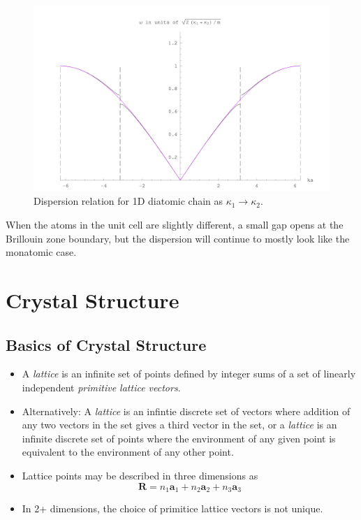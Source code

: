 \documentclass[10pt]{article}
\begin{document}
\begin{figure}
  \includegraphics[width=\linewidth]{1d_dia_to_mono.png}
  \caption{Dispersion relation for 1D diatomic chain as $\kappa_{1} \rightarrow \kappa_{2}$.}
\end{figure}

When the atoms in the unit cell are slightly different, a small gap opens at the Brillouin zone boundary, but the dispersion will continue to mostly
look like the monatomic case.


\section{Crystal Structure}
\subsection{Basics of Crystal Structure}
\begin{itemize}
\item A \emph{lattice} is an infinite set of points defined by integer sums of a set of linearly
independent \emph{primitive lattice vectors}.
\item Alternatively: A \emph{lattice} is an infintie discrete set of vectors where addition of
any two vectors in the set gives a third vector in the set, or a \emph{lattice} is an infinite
discrete set of points where the environment of any given point is equivalent to the environment
of any other point.
\item Lattice points may be described in three dimensions as
$$\textbf{R} = n_{1}\textbf{a}_{1} + n_{2}\textbf{a}_2 + n_{3}\textbf{a}_{3}$$
\item In 2+ dimensions, the choice of primitice lattice vectors is not unique.
\end{itemize}
\end{document}
